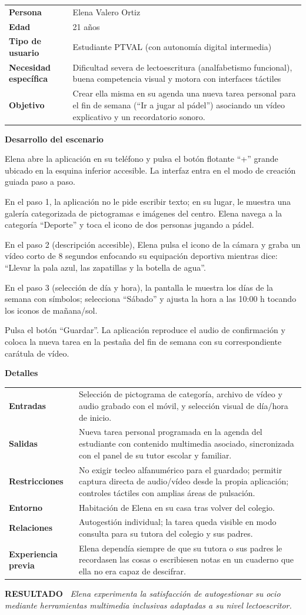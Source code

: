 \documentclass[11pt,a4paper]{article}
\makeatletter
\newcommand{\escenariocard}[6]{%
\needspace{10\baselineskip}
\begin{tcolorbox}[breakable,enhanced,colback=white,colframe=brandgreen,boxrule=0.8pt,arc=3pt,
 left=9pt,right=9pt,top=7pt,bottom=7pt,before skip=10pt,after skip=10pt,
 title={\textbf{\color{white}ESCENARIO #1} \\[1pt] {\small\color{tintgreen}#2}},
 colbacktitle=brandgreen,coltitle=white,fonttitle=\bfseries,boxed title style={colframe=brandgreen}]
{\setlength{\parskip}{0pt}\renewcommand{\arraystretch}{1.35}\rowcolors{1}{tintgreen}{white}\arrayrulecolor{white}
\begin{tabular}{@{\hspace{4pt}}>{\bfseries\color{brandgreen}}p{3.4cm}p{11.4cm}@{}}
#3 \\
\end{tabular}}
\vspace{6pt}
\textbf{\color{brandblue}Desarrollo del escenario}\par\vspace{2pt}
#4
\par\vspace{4pt}
\textbf{\color{brandblue}Detalles}\par\vspace{2pt}
{\setlength{\parskip}{0pt}\renewcommand{\arraystretch}{1.35}\rowcolors{1}{tintblue}{white}\arrayrulecolor{white}
\begin{tabular}{@{\hspace{4pt}}>{\bfseries\color{brandblue}}p{3.4cm}p{11.4cm}@{}}
#5 \\
\end{tabular}}
\vspace{6pt}
\begin{tcolorbox}[colback=tintblue,colframe=brandblue,boxrule=0pt,sharp corners,borderline west={3pt}{0pt}{brandblue},left=8pt,right=8pt,top=5pt,bottom=5pt]
\textbf{\small\color{brandblue}RESULTADO\ } {\small\itshape #6}
\end{tcolorbox}
\end{tcolorbox}
}
\makeatother
\begin{document}
\escenariocard{6}{Creación de una tarea personal de ocio con soporte en vídeo y audio}{%
Persona & Elena Valero Ortiz \\
Edad & 21 años \\
Tipo de usuario & Estudiante PTVAL (con autonomía digital intermedia) \\
Necesidad específica & Dificultad severa de lectoescritura (analfabetismo funcional), buena competencia visual y motora con interfaces táctiles \\
Objetivo & Crear ella misma en su agenda una nueva tarea personal para el fin de semana (``Ir a jugar al pádel'') asociando un vídeo explicativo y un recordatorio sonoro.
}{%
Elena abre la aplicación en su teléfono y pulsa el botón flotante ``+'' grande ubicado en la esquina inferior accesible. La interfaz entra en el modo de creación guiada paso a paso.

En el paso 1, la aplicación no le pide escribir texto; en su lugar, le muestra una galería categorizada de pictogramas e imágenes del centro. Elena navega a la categoría ``Deporte'' y toca el icono de dos personas jugando a pádel.

En el paso 2 (descripción accesible), Elena pulsa el icono de la cámara y graba un vídeo corto de 8 segundos enfocando su equipación deportiva mientras dice: ``Llevar la pala azul, las zapatillas y la botella de agua''.

En el paso 3 (selección de día y hora), la pantalla le muestra los días de la semana con símbolos; selecciona ``Sábado'' y ajusta la hora a las 10:00 h tocando los iconos de mañana/sol.

Pulsa el botón ``Guardar''. La aplicación reproduce el audio de confirmación y coloca la nueva tarea en la pestaña del fin de semana con su correspondiente carátula de vídeo.
}{%
Entradas & Selección de pictograma de categoría, archivo de vídeo y audio grabado con el móvil, y selección visual de día/hora de inicio. \\
Salidas & Nueva tarea personal programada en la agenda del estudiante con contenido multimedia asociado, sincronizada con el panel de su tutor escolar y familiar. \\
Restricciones & No exigir tecleo alfanumérico para el guardado; permitir captura directa de audio/vídeo desde la propia aplicación; controles táctiles con amplias áreas de pulsación. \\
Entorno & Habitación de Elena en su casa tras volver del colegio. \\
Relaciones & Autogestión individual; la tarea queda visible en modo consulta para su tutora del colegio y sus padres. \\
Experiencia previa & Elena dependía siempre de que su tutora o sus padres le recordasen las cosas o escribiesen notas en un cuaderno que ella no era capaz de descifrar.
}{Elena experimenta la satisfacción de autogestionar su ocio mediante herramientas multimedia inclusivas adaptadas a su nivel lectoescritor.}
\end{document}
